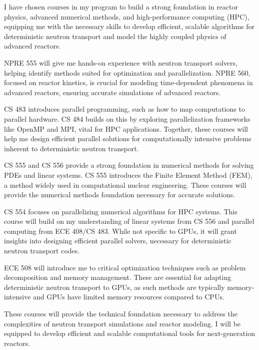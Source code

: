 \documentclass[12pt]{letter}
\begin{document}
I have chosen courses in my program to build a strong foundation in reactor
physics, advanced numerical methods, and high-performance computing (HPC),
equipping me with the necessary skills to develop efficient, scalable
algorithms for deterministic neutron transport and model the highly coupled
physics of advanced reactors.

NPRE 555 will give me hands-on experience with neutron transport solvers,
helping identify methods suited for optimization and parallelization. NPRE 560,
focused on reactor kinetics, is crucial for modeling time-dependent phenomena
in advanced reactors, ensuring accurate simulations of advanced reactors.

CS 483 introduces parallel programming, such as how to map computations to
parallel hardware. CS 484 builds on this by exploring parallelization
frameworks like OpenMP and MPI, vital for HPC applications. Together, these
courses will help me design efficient parallel solutions for computationally
intensive problems inherent to deterministic neutron transport.

CS 555 and CS 556 provide a strong foundation in numerical methods for solving
PDEs and linear systems. CS 555 introduces the Finite Element Method (FEM), a
method widely used in computational nuclear engineering. These courses will
provide the numerical methods foundation necessary for accurate solutions.  

CS 554 focuses on parallelizing numerical algorithms for HPC systems. This
course will build on my understanding of linear systems from CS 556 and
parallel computing from ECE 408/CS 483. While not specific to GPUs, it will
grant insights into designing efficient parallel solvers, necessary for
deterministic neutron transport codes.

ECE 508 will introduce me to critical optimization techniques such as problem
decomposition and memory management. These are essential for adapting
deterministic neutron transport to GPUs, as such methods are typically
memory-intensive and GPUs have limited memory resources compared to CPUs.

These courses will provide the technical foundation necessary to address the
complexities of neutron transport simulations and reactor modeling. I will be
equipped to develop efficient and scalable computational tools for
next-generation reactors.
\end{document}
